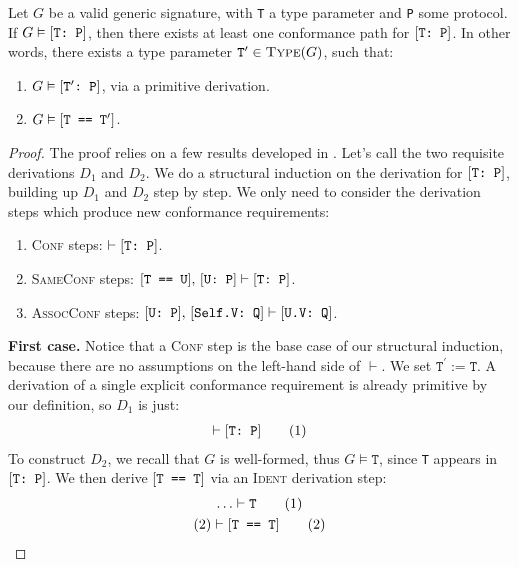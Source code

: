 \documentclass[../generics]{subfiles}
\begin{document}
\begin{theorem}\label{conformance paths theorem} Let $G$ be a valid generic signature, with \texttt{T} a type parameter and \texttt{P} some protocol. If $G\vDash[\texttt{T:~P}]$, then there exists at least one conformance path for $[\texttt{T:~P}]$. In other words, there exists a type parameter $\texttt{T}^\prime\in\textsc{Type}({G})$, such that:
\begin{enumerate}
\item $G\vDash[\texttt{$\texttt{T}^\prime$:~P}]$, via a primitive derivation.
\item $G\vDash[\texttt{T == $\texttt{T}^\prime$}]$.
\end{enumerate}
\end{theorem}
\begin{proof}
The proof relies on a few results developed in . Let's call the two requisite derivations $D_1$ and $D_2$. We do a structural induction on the derivation for $[\texttt{T:~P}]$, building up $D_1$ and $D_2$ step by step. We only need to consider the derivation steps which produce new conformance requirements:
\begin{enumerate}
\item {}\textsc{Conf} steps: $\vdash[\texttt{T:~P}]$.
\item {}\textsc{SameConf} steps: $[\texttt{T == U}],\,[\texttt{U:~P}]\vdash[\texttt{T:~P}]$.
\item {}\textsc{AssocConf} steps: $[\texttt{U:~P}],\,[\texttt{Self.V:~Q}]\vdash[\texttt{U.V:~Q}]$.
\end{enumerate}

\noindent \textbf{First case.} Notice that a \textsc{Conf} step is the base case of our structural induction, because there are no assumptions on the left-hand side of $\vdash$. We set $\texttt{T}^\prime := \texttt{T}$. A derivation of a single explicit conformance requirement is already primitive by our definition, so $D_1$ is just:
\begin{gather*}
\vdash[\texttt{T:~P}]\tag{1}
\end{gather*}
To construct $D_2$, we recall that $G$ is well-formed, thus $G\vDash\texttt{T}$, since \texttt{T} appears in $[\texttt{T:~P}]$. We then derive $[\texttt{T == T}]$ via an \textsc{Ident} derivation step:
\begin{gather*}
\ldots\vdash\texttt{T}\tag{1}\\
(2)\vdash[\texttt{T == T}]\tag{2}
\end{gather*}


\end{proof}
\end{document}
